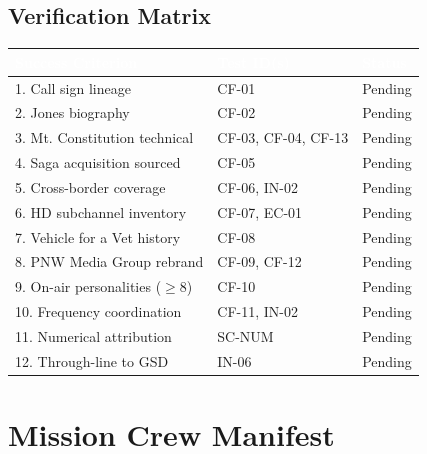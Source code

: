 \documentclass[11pt,letterpaper]{article}
\newcommand{\tableheader}[1]{\textbf{\sffamily\textcolor{white}{#1}}}
\begin{document}
\subsection{Verification Matrix}

\begin{center}
\begin{tabularx}{\textwidth}{XL{3.5cm}C{1.5cm}}
\toprule
{}
\tableheader{Success Criterion} & \tableheader{Test ID(s)} & \tableheader{Status} \\
. Call sign lineage & CF-01 & Pending \\
2. Jones biography & CF-02 & Pending \\
3. Mt. Constitution technical & CF-03, CF-04, CF-13 & Pending \\
4. Saga acquisition sourced & CF-05 & Pending \\
5. Cross-border coverage & CF-06, IN-02 & Pending \\
6. HD subchannel inventory & CF-07, EC-01 & Pending \\
7. Vehicle for a Vet history & CF-08 & Pending \\
8. PNW Media Group rebrand & CF-09, CF-12 & Pending \\
9. On-air personalities ($\geq$8) & CF-10 & Pending \\
10. Frequency coordination & CF-11, IN-02 & Pending \\
11. Numerical attribution & SC-NUM & Pending \\
12. Through-line to GSD & IN-06 & Pending \\
\bottomrule
\end{tabularx}
\end{center}

\section{Mission Crew Manifest}
\end{document}
